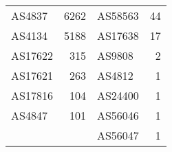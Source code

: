 \begin{tabular}{lr@{\qquad}lr}
AS4837  & 6262 & AS58563 &   44 \\
AS4134  & 5188 & AS17638 &   17 \\
AS17622 &  315 & AS9808  &    2 \\
AS17621 &  263 & AS4812  &    1 \\
AS17816 &  104 & AS24400 &    1 \\
AS4847  &  101 & AS56046 &    1 \\
        &      & AS56047 &    1
\end{tabular}
